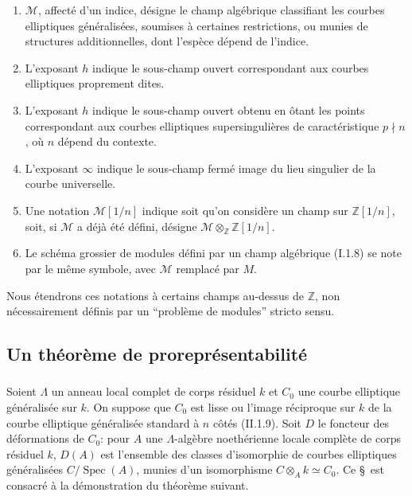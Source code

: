 \documentclass[11pt,a4paper]{amsart}
\theoremstyle{plain}
\theoremstyle{definition}
\DeclareMathOperator{\Spec}{Spec}
\newcommand{\mll}{\mathcal{M}}
\newcommand{\ZZ}{\mathbb{Z}}
\begin{document}
\begin{enumerate}[label=\alph*)]
\item $\mll$, affect\'e d'un indice, d\'esigne le champ alg\'ebrique classifiant les courbes elliptiques g\'en\'eralis\'ees, soumises \`a certaines restrictions, ou munies de structures additionnelles, dont l'esp\`ece d\'epend de l'indice.

\item L'exposant $h$ indique le sous-champ ouvert correspondant aux courbes elliptiques proprement dites.

\item L'exposant $h$ indique le sous-champ ouvert obtenu en \^otant les points correspondant aux courbes elliptiques supersinguli\`eres de caract\'eristique $p \nmid n$, o\`u $n$ d\'epend du contexte.

\item L'exposant $\infty$ indique le sous-champ ferm\'e image du lieu singulier de la courbe universelle.

\item Une notation $\mll[1/n]$ indique soit qu'on consid\`ere un champ sur $\ZZ[1/n]$, soit, si $\mll$ a d\'ej\`a \'et\'e d\'efini, d\'esigne $\mll \otimes_{\ZZ} \ZZ[1/n]$.

\item Le sch\'ema grossier de modules d\'efini par un champ alg\'ebrique (I.1.8) se note par le m\^eme symbole, avec $\mll$ remplac\'e par $M$.
\end{enumerate}

Nous \'etendrons ces notations \`a certains champs au-dessus de $\ZZ$, non n\'ecessairement d\'efinis par un ``probl\`eme de modules'' stricto sensu.


\subsection{Un th\'eor\`eme de prorepr\'esentabilit\'e}

\subsubsection{}
Soient $\Lambda$ un anneau local complet de corps r\'esiduel $k$ et $C_0$ une courbe elliptique g\'en\'eralis\'ee sur $k$. On suppose que $C_0$ est lisse ou l'image r\'eciproque sur $k$ de la courbe elliptique g\'en\'eralis\'ee standard \`a $n$ c\^ot\'es (II.1.9). Soit $D$ le foncteur des d\'eformations de $C_0$: pour $A$ une $\Lambda$-alg\`ebre noeth\'erienne locale compl\`ete de corps r\'esiduel $k$, $D(A)$ est l'ensemble des classes d'isomorphie de courbes elliptiques g\'en\'eralis\'ees $C/\Spec(A)$, munies d'un isomorphisme $C \otimes_A k \simeq C_0$. Ce \S\ est consacr\'e \`a la d\'emonstration du th\'eor\`eme suivant.
\end{document}
